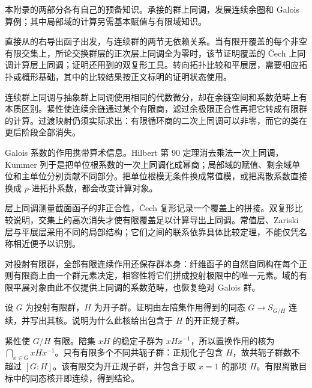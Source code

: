 \ProseParagraphBreak
本附录的两部分各有自己的预备知识。承接的群上同调，发展连续余圈和 Galois 算例；其中局部域的计算另需基本赋值与有限域知识。

\ProseParagraphBreak
{}直接从的右导出函子出发，与连续群的两节无依赖关系。当有限开覆盖的每个非空有限交集上，所论交换群层的正次层上同调全为零时，该节证明覆盖的 Čech 上同调计算层上同调；证明还用到的双复形工具。转向拓扑比较和平展层，需要相应拓扑或概形基础，其中的比较结果按正文标明的证明状态使用。






\begin{chaptersummary}
	连续群上同调与抽象群上同调使用相同的代数微分，却在余链空间和系数范畴上有本质区别。紧性使连续余链通过某个有限商，滤过余极限正合性再把它转成有限群的计算。过渡映射仍须实际求出：有限循环商的二次上同调可以非零，而它的类在更后阶段全部消失。

	\ProseParagraphBreak
	Galois 系数的作用携带算术信息。Hilbert 第 90 定理消去乘法一次上同调，Kummer 列于是把单位根系数的一次上同调化成幂商；局部域的赋值、剩余域单位和主单位分别贡献不同部分。把单位根模无条件换成常值模，或把离散系数直接换成 \(p\)-进拓扑系数，都会改变计算对象。

	\ProseParagraphBreak
	层上同调测量截面函子的非正合性，Čech 复形记录一个覆盖上的拼接。双复形比较说明，交集上的高次消失才使有限覆盖足以计算导出上同调。常值层、Zariski 层与平展层采用不同的局部结构；它们之间的联系依靠具体比较定理，不能仅凭名称相近便予以识别。

	\ProseParagraphBreak
	对投射有限群，全部有限连续作用还保存群本身：纤维函子的自然自同构在每个正则有限商上由一个群元素决定，相容性将它们拼成投射极限中的唯一元素。域的有限平展对象由此不仅提供上同调的系数范畴，也恢复绝对 Galois 群。
\end{chaptersummary}

\BookExercises

\begin{exercise}\label{b4:ex:C-open-kernel}
	设 \(G\) 为投射有限群，\(H\) 为开子群。证明由左陪集作用得到的同态 \(G\rightarrow S_{G/H}\) 连续，并写出其核。说明为什么此核给出包含于 \(H\) 的开正规子群。
\end{exercise}
\begin{solution}
	紧性使 \(G/H\) 有限。陪集 \(xH\) 的稳定子群为 \(xHx^{-1}\)，所以置换作用的核为 \(\bigcap_{x\in G}xHx^{-1}\)。只有有限多个不同共轭子群：正规化子包含 \(H\)，故共轭子群数不超过 \([G:H]\)。该有限交为开正规子群，并包含于取 \(x=1\) 的那项 \(H\)。有限离散目标中的同态核开即连续，得到结论。
\end{solution}

